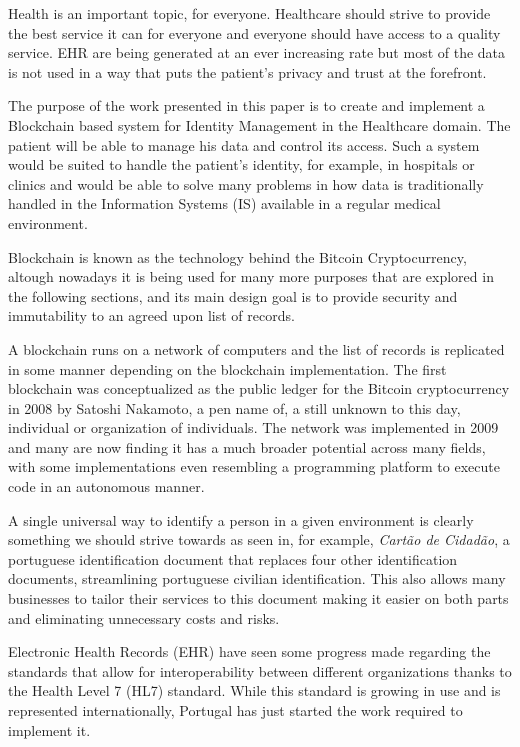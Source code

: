 \documentclass[]{llncs}
\begin{document}
Health is an important topic, for everyone. Healthcare should strive to provide the best service it can for everyone 
and everyone should have access to a quality service. EHR are being generated at an ever increasing rate but most of 
the data is not used in a way that puts the patient's privacy and trust at the forefront.

The purpose of the work presented in this paper is to create and implement a Blockchain based system for Identity Management 
in the Healthcare domain. The patient will be able to manage his data and control its access. Such a system would be suited 
to handle the patient’s identity, for example, in hospitals or clinics and would be able to solve many problems in how data 
is traditionally handled in the Information Systems (IS) available in a regular medical environment.

Blockchain is known as the technology behind the Bitcoin Cryptocurrency, altough nowadays it is being used for many more 
purposes that are explored in the following sections, and its main design goal is to provide security and immutability to 
an agreed upon list of records.

A blockchain runs on a network of computers and the list of records is replicated in some manner depending on the blockchain 
implementation. The first blockchain was conceptualized as the public ledger for the Bitcoin cryptocurrency in 2008 by 
Satoshi Nakamoto, a pen name of, a still unknown to this day, individual or organization of individuals. 
The network was implemented in 2009 and many are now finding it has a much broader potential across many fields, 
with some implementations even resembling a programming platform to execute code in an autonomous manner.
\cite{Nakamoto2008}

A single universal way to identify a person in a given environment is clearly something we should strive towards as seen in, 
for example, \textit{Cartão de Cidadão}, a portuguese identification document that replaces four other identification documents, 
streamlining portuguese civilian identification. 
This also allows many businesses to tailor their services to this document making it easier on both parts and eliminating 
unnecessary costs and risks.

Electronic Health Records (EHR) have seen some progress made regarding the standards that allow for 
interoperability between different organizations thanks to the Health Level 7 (HL7) standard. 
While this standard is growing in use and is represented internationally, Portugal has just started 
the work required to implement it.
\cite{HealthLevel7}
\end{document}
